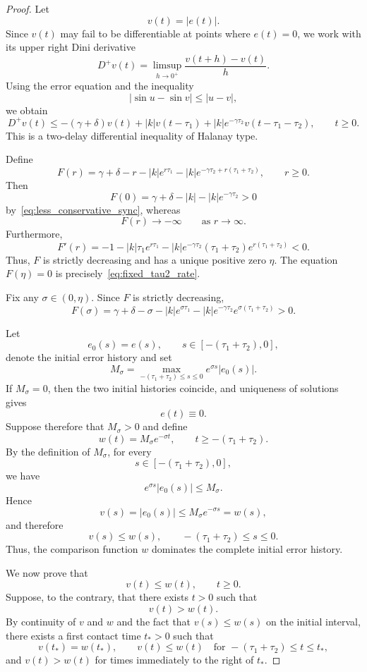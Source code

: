 \documentclass[10pt,a4paper]{amsart}
\begin{document}
\begin{proof}
Let
\[
v(t)=|e(t)|.
\]
Since $v(t)$ may fail to be differentiable at points where $e(t)=0$, we work with its upper right Dini derivative
\[
D^+v(t)
=
\limsup_{h\to0^+}
\frac{v(t+h)-v(t)}{h}.
\]
Using the error equation and the inequality
\[
|\sin u-\sin v|\leq |u-v|,
\]
we obtain
\begin{equation}
D^+v(t)
\leq
-(\gamma+\delta)v(t)
+|k|v(t-\tau_1)
+|k|e^{-\gamma\tau_2}
v(t-\tau_1-\tau_2),
\qquad t\geq0.
\label{eq:fixed_tau2_dini}
\end{equation}
This is a two-delay differential inequality of Halanay type.

Define
\[
F(r)
=
\gamma+\delta-r
-|k|e^{r\tau_1}
-|k|e^{-\gamma\tau_2+r(\tau_1+\tau_2)},
\qquad r\geq0.
\]
Then
\[
F(0)
=
\gamma+\delta-|k|-|k|e^{-\gamma\tau_2}>0
\]
by~\eqref{eq:less_conservative_sync}, whereas
\[
F(r)\to-\infty
\qquad\text{as }r\to\infty.
\]
Furthermore,
\[
F'(r)
=
-1
-|k|\tau_1e^{r\tau_1}
-|k|e^{-\gamma\tau_2}
(\tau_1+\tau_2)e^{r(\tau_1+\tau_2)}
<0.
\]
Thus, $F$ is strictly decreasing and has a unique positive zero $\eta$. The equation $F(\eta)=0$ is precisely~\eqref{eq:fixed_tau2_rate}.

Fix any $\sigma\in(0,\eta)$. Since $F$ is strictly decreasing,
\[
F(\sigma)
=
\gamma+\delta-\sigma
-|k|e^{\sigma\tau_1}
-|k|e^{-\gamma\tau_2}
e^{\sigma(\tau_1+\tau_2)}
>0.
\label{eq:positive_margin_sigma}
\]

Let
\[
e_0(s)=e(s),
\qquad
s\in[-(\tau_1+\tau_2),0],
\]
denote the initial error history and set
\[
M_\sigma
=
\max_{-(\tau_1+\tau_2)\leq s\leq0}
e^{\sigma s}|e_0(s)|.
\]
If $M_\sigma=0$, then the two initial histories coincide, and uniqueness of solutions gives
\[
e(t)\equiv0.
\]
Suppose therefore that $M_\sigma>0$ and define
\[
w(t)=M_\sigma e^{-\sigma t},
\qquad
t\geq-(\tau_1+\tau_2).
\]
By the definition of $M_\sigma$, for every
\[
s\in[-(\tau_1+\tau_2),0],
\]
we have
\[
e^{\sigma s}|e_0(s)|
\leq M_\sigma.
\]
Hence
\[
v(s)=|e_0(s)|
\leq
M_\sigma e^{-\sigma s}
=
w(s),
\]
and therefore
\[
v(s)\leq w(s),
\qquad
-(\tau_1+\tau_2)\leq s\leq0.
\]
Thus, the comparison function $w$ dominates the complete initial error history.

We now prove that
\[
v(t)\leq w(t),
\qquad t\geq0.
\]
Suppose, to the contrary, that there exists $t>0$ such that
\[
v(t)>w(t).
\]
By continuity of $v$ and $w$ and the fact that $v(s)\leq w(s)$ on the initial interval, there exists a first contact time $t_*>0$ such that
\[
v(t_*)=w(t_*),
\qquad
v(t)\leq w(t)
\quad
\text{for }
-(\tau_1+\tau_2)\leq t\leq t_*,
\]
and $v(t)>w(t)$ for times immediately to the right of $t_*$.


\end{proof}
\end{document}

